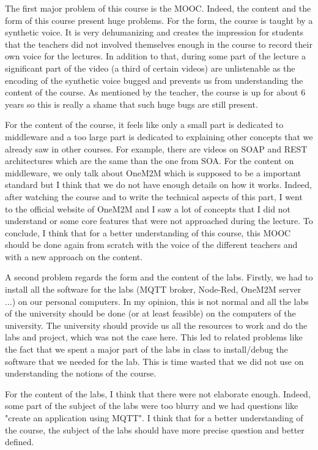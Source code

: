 The first major problem of this course is the MOOC. Indeed, the content and the form of this course present huge problems. For the form, the course is taught by a synthetic voice. It is very dehumanizing and creates the impression for students that the teachers did not involved themselves enough in the course to record their own voice for the lectures. In addition to that, during some part of the lecture a significant part of the video (a third of certain videos) are unlistenable as the encoding of the synthetic voice bugged and prevents us from understanding the content of the course. As mentioned by the teacher, the course is up for about 6 years so this is really a shame that such huge bugs are still present. 
\par
For the content of the course, it feels like only a small part is dedicated to middleware and a too large part is dedicated to explaining other concepts that we already saw in other courses. For example, there are videos on SOAP and REST architectures which are the same than the one from SOA. For the content on middleware, we only talk about OneM2M which is supposed to be a important standard but I think that we do not have enough details on how it works. Indeed, after watching the course and to write the technical aspects of this part, I went to the official website of OneM2M and I saw a lot of concepts that I did not understand or some core features that were not approached during the lecture. To conclude, I think that for a better understanding of this course, this MOOC should be done again from scratch with the voice of the different teachers and with a new approach on the content.
\\\par

A second problem regards the form and the content of the labs. Firstly, we had to install all the software for the labs (MQTT broker, Node-Red, OneM2M server ...) on our personal computers. In my opinion, this is not normal and all the labs of the university should be done (or at least feasible) on the computers of the university. The university should provide us all the resources to work and do the labs and project, which was not the case here. This led to related problems like the fact that we spent a major part of the labs in class to install/debug the software that we needed for the lab. This is time wasted that we did not use on understanding the notions of the course. 
\par
For the content of the labs, I think that there were not elaborate enough. Indeed, some part of the subject of the labs were too blurry and we had questions like "create an application using MQTT". I think that for a better understanding of the course, the subject of the labs should have more precise question and better defined.
\\\par 

